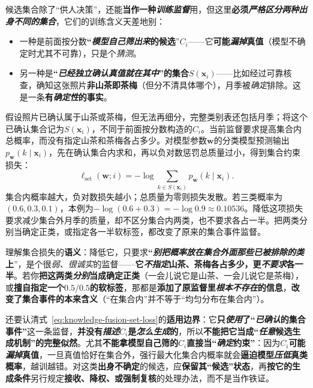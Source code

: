 候选集合除了“供人决策”，还能\textbf{当作一种\emph{训练监督}}用，但这里\textbf{必须\emph{严格区分两种\emph{出身不同}的集合}}，它们的训练含义天差地别：
\begin{itemize}\item 一种是前面按分数\textbf{“\emph{模型自己\emph{筛}出来}的候选}”$C_i$——它\textbf{可能\emph{漏掉}真值}（模型不确定时尤其不可靠），只是个\emph{猜测}。\item 另一种是\textbf{“\emph{已经\emph{独立确认}真值就在其中}”的集合}$S(\bm{x}_i)$——比如经过可靠核查，确知这张照片\textbf{非山茶即茶梅}（但分不清具体哪个），月季被\emph{确定}排除。这是一条\textbf{有\emph{确定性}的事实}。\end{itemize}假设照片已确认属于山茶或茶梅，但无法再细分，完整类别表还包括月季；将这个已确认集合记为$S(\bm{x}_i)$，不同于前面按分数构造的$C_i$。当前监督要求提高集合内总概率，而没有指定山茶和茶梅各占多少。对模型参数$\bm{w}$的分类模型预测输出$p_{\bm{w}}(k\mid\bm{x}_i)$，先在确认集合内求和，再以负对数惩罚总质量过小，得到集合约束损失：
\begin{equation}
  \ell_{\mathrm{set}}(\bm{w};i)
  =-\log\sum_{k\in S(\bm{x}_i)}
    p_{\bm{w}}(k\mid\bm{x}_i).
  \label{eq:knowledge-fusion-set-loss}
\end{equation}
集合内概率越大，负对数损失越小；总质量为零则损失发散。若三类概率为$(0.6,0.3,0.1)$，本例为$-\log(0.6+0.3)=-\log0.9\approx0.10536$。降低这项损失要求减少集合外月季的质量，却不区分集合内两类，也不要求各占一半。把两类分别当确定正类，或指定各一半软标签，都改变了原来的集合事件监督。

理解集合损失的\textbf{语义}：降低它，只要求\textbf{“\emph{别把概率放在集合\emph{外面}那些\emph{已被排除}的类}上}”，是个很\emph{弱、很诚实}的监督——\textbf{它\emph{不指定}山茶、茶梅各占多少，更\emph{不要求}各一半}。若你\textbf{把这两类\emph{分别}当成确定正类}（一会儿说它是山茶、一会儿说它是茶梅），或\textbf{擅自指定一个$0.5/0.5$的软标签}，那都是\textbf{添加了原监督里\emph{根本不存在}的信息}，\textbf{改变了集合事件的本来含义}（“在集合内”并不等于“均匀分布在集合内”）。

还要认清式~\eqref{eq:knowledge-fusion-set-loss}的\textbf{适用边界}：它\textbf{只\emph{使用}了“\emph{已确认}的集合事件”}这一条监督，\textbf{并没有\emph{描述}$C_i$是\emph{怎么生成}的}，所以\textbf{不能把它当成“\emph{任意}候选生成机制”的完整似然}。尤其\textbf{不能拿模型自己筛的$C_i$直接当“\emph{确定}约束”}：因为$C_i$\textbf{可能\emph{漏掉}真值}，一旦真值恰好在集合外，强行最大化集合内概率就会\textbf{逼迫模型\emph{压低}真类概率}，越训越错。对这类\textbf{出身不确定}的候选，应\textbf{保留其“候选”状态}，再\textbf{按它的生成条件}另行规定\textbf{接收、降权、或强制复核}的处理办法，而不是当作铁证。

